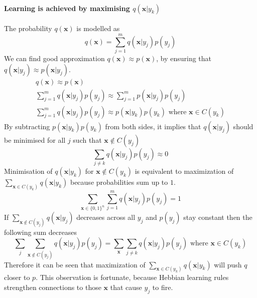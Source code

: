 \documentclass[12pt]{article}
\begin{document}
\paragraph{Learning is achieved by maximising $q(\boldsymbol{x}|y_k)$}
The probability $q(\boldsymbol{x})$ is modelled as
\[
q(\boldsymbol{x}) = \sum_{j=1}^{m} q(\boldsymbol{x}|y_j)p(y_j)
\]
We can find good approximation $q(\boldsymbol{x})\approx p(\boldsymbol{x})$, by ensuring that $q(\boldsymbol{x}|y_j)\approx p(\boldsymbol{x}|y_j)$. 
\begin{gather*}
	q(\boldsymbol{x}) \approx p(\boldsymbol{x}) \\
	\sum_{j=1}^{m} q(\boldsymbol{x}|y_j)p(y_j) \approx \sum_{j=1}^{m} p(\boldsymbol{x}|y_j)p(y_j) \\
	\sum_{j=1}^{m} q(\boldsymbol{x}|y_j)p(y_j)  \approx p(\boldsymbol{x}|y_k)p(y_k) \text{ where }\boldsymbol{x}\in C(y_k)
\end{gather*}
By subtracting $p(\boldsymbol{x}|y_k)p(y_k)$ from both sides, it implies that $ q(\boldsymbol{x}|y_j)$ should be minimised for all $j$ such that $\boldsymbol{x}\notin C(y_j)$
\[
	\sum_{j\ne k} q(\boldsymbol{x}|y_j)p(y_j) \approx 0 
\]
Minimisation of $q(\boldsymbol{x}|y_k)$ for $\boldsymbol{x}\notin C(y_k)$ is equivalent to maximization of $\sum_{\boldsymbol{x}\in C(y_k)}q(\boldsymbol{x}|y_k)$ because probabilities sum up to $1$. 
\[
\sum_{\boldsymbol{x}\in\{0,1\}^n} \sum_{j=1}^{m} q(\boldsymbol{x}|y_j)p(y_j) = 1
\]
If $\sum_{\boldsymbol{x}\notin C(y_j)} q(\boldsymbol{x}|y_j)$ decreases across all $y_j$ and $p(y_j)$ stay constant then the following sum decreases
\[
\sum_{j} \sum_{\boldsymbol{x}\notin C(y_j)} q(\boldsymbol{x}|y_j) p(y_j) = \sum_{\boldsymbol{x}} \sum_{j\ne k}  q(\boldsymbol{x}|y_j) p(y_j) \text{ where }\boldsymbol{x}\in C(y_k)
\]
Therefore it can be seen that maximization of $\sum_{\boldsymbol{x}\in C(y_k)}q(\boldsymbol{x}|y_k)$ will push $q$ closer to $p$. This observation is fortunate, because Hebbian learning rules strengthen connections to those $\boldsymbol{x}$ that cause $y_j$ to fire.
\end{document}
